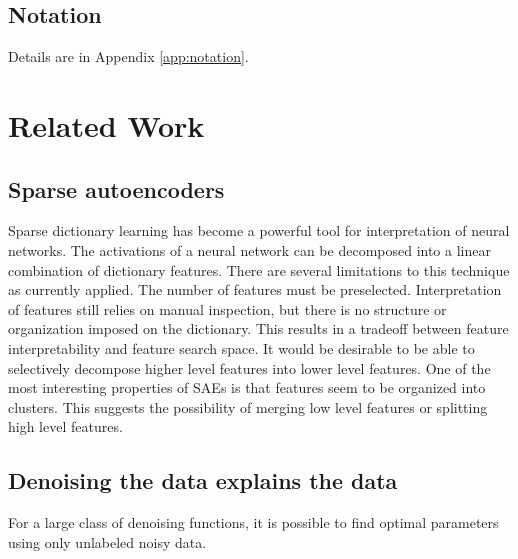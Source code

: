 \subsection{Notation}
Details are in Appendix \ref{app:notation}.



\section{Related Work}

\subsection{Sparse autoencoders}
Sparse dictionary learning has become a powerful tool for interpretation of neural networks. 
The activations of a neural network can be decomposed into a linear combination of dictionary features\cite{cunningham2023sparse}.
There are several limitations to this technique as currently applied.
The number of features must be preselected.
Interpretation of features still relies on manual inspection,
but there is no structure or organization imposed on the dictionary.
This results in a tradeoff between feature interpretability and feature search space. 
It would be desirable to be able to selectively decompose higher level features into lower level features.
One of the most interesting properties of SAEs is that features seem to be organized into clusters\cite{bricken2023monosemanticity}.
This suggests the possibility of merging low level features or splitting high level features.



\subsection{Denoising the data explains the data}
For a large class of denoising functions, it is possible to find optimal parameters using only unlabeled noisy data\cite{batson2019noise2self}.


